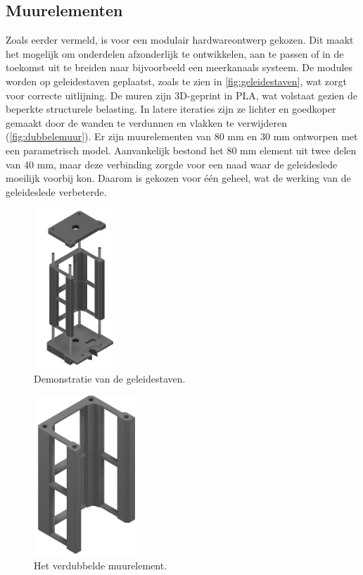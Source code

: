 \subsection{Muurelementen}
Zoals eerder vermeld, is voor een modulair hardwareontwerp gekozen. Dit maakt het mogelijk om onderdelen afzonderlijk te ontwikkelen, aan te passen of in de toekomst uit te breiden naar bijvoorbeeld een meerkanaals systeem. De modules worden op geleidestaven geplaatst, zoals te zien in \autoref{fig:geleidestaven}, wat zorgt voor correcte uitlijning.
De muren zijn 3D-geprint in PLA, wat volstaat gezien de beperkte structurele belasting. In latere iteraties zijn ze lichter en goedkoper gemaakt door de wanden te verdunnen en vlakken te verwijderen (\autoref{fig:dubbelemuur}). Er zijn muurelementen van 80 mm en 30 mm ontworpen met een parametrisch model. Aanvankelijk bestond het 80 mm element uit twee delen van 40 mm, maar deze verbinding zorgde voor een naad waar de geleideslede moeilijk voorbij kon. Daarom is gekozen voor één geheel, wat de werking van de geleideslede verbeterde.\\[12pt]\begin{minipage}[t]{0.49\textwidth}
    \vspace{0pt}
    \begin{figure}[H]
        \centering
        \includegraphics[height=6cm]{figures/GuidesDemonstration_2.png}
        \caption{Demonstratie van de geleidestaven.}\label{fig:geleidestaven}
    \end{figure}
\end{minipage}
\begin{minipage}[t]{0.49\textwidth}
    \vspace{0pt}
    \begin{figure}[H]
        \centering
        \includegraphics[height=6cm]{figures/Wall_2_w.png}
        \caption{Het verdubbelde muurelement.}\label{fig:dubbelemuur}
    \end{figure}
\end{minipage}\\

